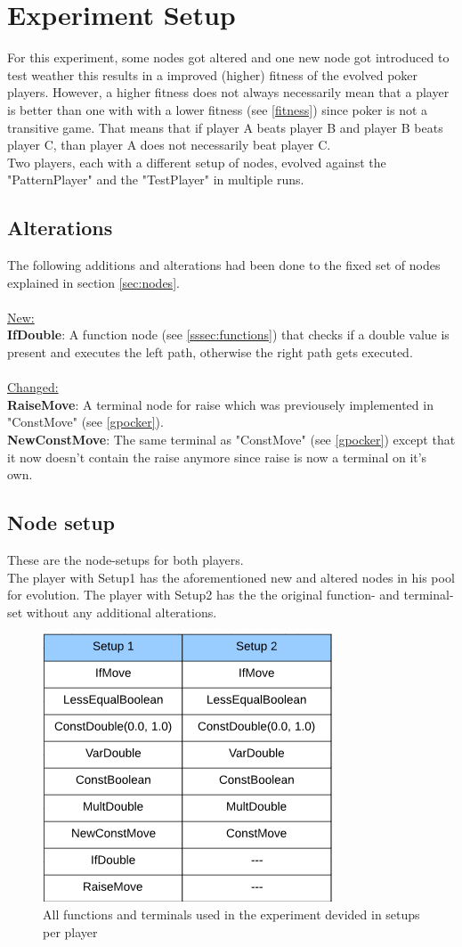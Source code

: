 \documentclass[12pt,fleqn,a4paper]{article}
\begin{document}
\section{Experiment Setup}
For this experiment, some nodes got altered and one new node got introduced to test weather this results in a improved (higher) fitness of the evolved poker players. However, a higher fitness does not always necessarily mean that a player is better than one with with a lower fitness (see \ref{fitness}) since poker is not a transitive game. That means that if player A beats player B and player B beats player C, than player A does not necessarily beat player C.\\
Two players, each with a different setup of nodes, evolved against the "PatternPlayer" and the "TestPlayer" in multiple runs.

\subsection{Alterations}
The following additions and alterations had been done to the fixed set of nodes explained in section \ref{sec:nodes}.\\\\
\underline{New:}\\
\textbf{IfDouble}: A function node (see \ref{sssec:functions}) that checks if a double value is present and executes the left path, otherwise the right path gets executed.\\\\
\underline{Changed:}\\
\textbf{RaiseMove}: A terminal node for raise which was previousely implemented in "ConstMove" (see \ref{gpocker}).\\
\textbf{NewConstMove}: The same terminal as "ConstMove" (see \ref{gpocker}) except that it now doesn't contain the raise anymore since raise is now a terminal on it's own.

\subsection{Node setup}
\label{ssec:nodesetup}
These are the node-setups for both players.\\
The player with Setup1 has the aforementioned new and altered nodes in his pool for evolution. The player with Setup2 has the the original function- and terminal-set without any additional alterations.\\

\begin{figure}[!ht]
	\begin{center}
	\includegraphics[width=.3\textwidth]{new_node_table.png}
	\caption{All functions and terminals used in the experiment devided in setups per player}
	\end{center}
\end{figure}	
\end{document}
